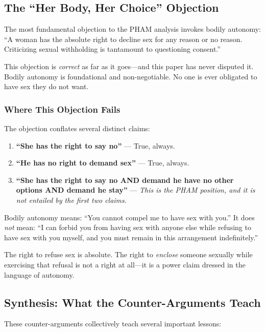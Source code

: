\documentclass[12pt, letterpaper]{article}
\begin{document}
\subsection{The ``Her Body, Her Choice'' Objection}

The most fundamental objection to the PHAM analysis invokes bodily autonomy: ``A woman has the absolute right to decline sex for any reason or no reason. Criticizing sexual withholding is tantamount to questioning consent.''

This objection is \textit{correct} as far as it goes---and this paper has never disputed it. Bodily autonomy is foundational and non-negotiable. No one is ever obligated to have sex they do not want.

\subsubsection{Where This Objection Fails}

The objection conflates several distinct claims:

\begin{enumerate}
    \item \textbf{``She has the right to say no''} --- True, always.
    
    \item \textbf{``He has no right to demand sex''} --- True, always.
    
    \item \textbf{``She has the right to say no AND demand he have no other options AND demand he stay''} --- \textit{This is the PHAM position, and it is not entailed by the first two claims}.
\end{enumerate}

Bodily autonomy means: ``You cannot compel me to have sex with you.'' It does \textit{not} mean: ``I can forbid you from having sex with anyone else while refusing to have sex with you myself, and you must remain in this arrangement indefinitely.''

The right to refuse sex is absolute. The right to \textit{enclose} someone sexually while exercising that refusal is not a right at all---it is a power claim dressed in the language of autonomy.

\subsection{Synthesis: What the Counter-Arguments Teach}

These counter-arguments collectively teach several important lessons:
\end{document}
